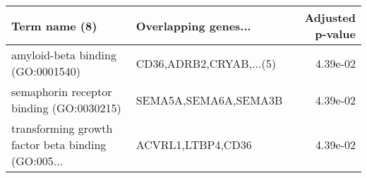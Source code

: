 \begin{tabular}{llr}
\toprule
                                     Term name (8) &    Overlapping genes... &  Adjusted p-value \\
\midrule
                 amyloid-beta binding (GO:0001540) & CD36,ADRB2,CRYAB,...(5) &          4.39e-02 \\
          semaphorin receptor binding (GO:0030215) &    SEMA5A,SEMA6A,SEMA3B &          4.39e-02 \\
transforming growth factor beta binding (GO:005... &       ACVRL1,LTBP4,CD36 &          4.39e-02 \\
\bottomrule
\end{tabular}
